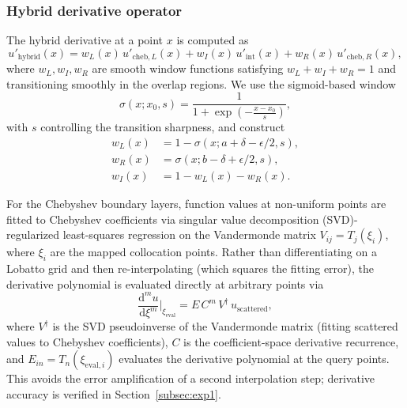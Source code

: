\documentclass[sn-mathphys,Numbered]{sn-jnl}
\theoremstyle{thmstyleone}
\theoremstyle{thmstyletwo}
\theoremstyle{thmstylethree}
\newcommand{\dd}{\mathrm{d}}
\newcommand{\cheb}{\mathrm{cheb}}
\newcommand{\hybrid}{\mathrm{hybrid}}
\begin{document}
\subsubsection{Hybrid derivative operator}
The hybrid derivative at a point $x$ is computed as
\begin{equation}
    u'_{\hybrid}(x) = w_L(x) \, u'_{\cheb,L}(x) + w_I(x) \, u'_{\mathrm{int}}(x) + w_R(x) \, u'_{\cheb,R}(x),
    \label{eq:hybrid_deriv}
\end{equation}
where $w_L, w_I, w_R$ are smooth window functions satisfying $w_L + w_I + w_R = 1$ and transitioning smoothly in the overlap regions. We use the sigmoid-based window
\begin{equation}
    \sigma(x; x_0, s) = \frac{1}{1 + \exp\left(-\frac{x - x_0}{s}\right)},
\end{equation}
with $s$ controlling the transition sharpness, and construct
\begin{align}
    w_L(x) &= 1 - \sigma(x; a+\delta-\epsilon/2, s), \\
    w_R(x) &= \sigma(x; b-\delta+\epsilon/2, s), \\
    w_I(x) &= 1 - w_L(x) - w_R(x).
\end{align}

For the Chebyshev boundary layers, function values at non-uniform points are fitted to Chebyshev coefficients via singular value decomposition (SVD)-regularized least-squares regression on the Vandermonde matrix $V_{ij} = T_j(\xi_i)$, where $\xi_i$ are the mapped collocation points. Rather than differentiating on a Lobatto grid and then re-interpolating (which squares the fitting error), the derivative polynomial is evaluated directly at arbitrary points via
\begin{equation}
    \frac{\dd^m u}{\dd \xi^m}\bigg|_{\xi_{\mathrm{eval}}} = E \, C^m \, V^\dagger \, u_{\mathrm{scattered}},
    \label{eq:cheb_direct_eval}
\end{equation}
where $V^\dagger$ is the SVD pseudoinverse of the Vandermonde matrix (fitting scattered values to Chebyshev coefficients), $C$ is the coefficient-space derivative recurrence, and $E_{in} = T_n(\xi_{\mathrm{eval},i})$ evaluates the derivative polynomial at the query points. This avoids the error amplification of a second interpolation step; derivative accuracy is verified in Section~\ref{subsec:exp1}.
\end{document}
